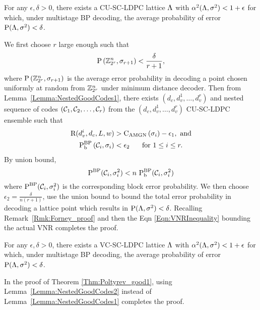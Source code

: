 \documentclass[journal,draftcls,onecolumn,12pt,twoside]{IEEEtran}
\begin{document}
\begin{theorem}\label{Thm:Poltyrev_good1}
   For any $\epsilon,\delta>0$, there exists a CU-SC-LDPC lattice $\Lambda$ with $\alpha^2(\Lambda,\sigma^2)<1+\epsilon$ for which, under multistage BP decoding, the average probability of error $\text{P}(\Lambda,\sigma^{2})<\delta$.
\end{theorem}
\begin{IEEEproof}
We first choose $r$ large enough such that 
\begin{equation}
\text{P}\left(\mathbb{Z}_{2^{r}}^{n},\sigma_{r+1}\right)<\frac{\delta}{r+1},\notag
\end{equation}
where $\text{P}\left(\mathbb{Z}_{2^{r}}^{n},\sigma_{r+1}\right)$ is the average error probability in decoding a point chosen uniformly at random from $\mathbb{Z}_{2^{r}}^{n}$ under minimum distance decoder. 
Then from Lemma~\ref{Lemma:NestedGoodCodes1}, there exists $(d_{c},d_{v}^{1},\ldots,d_{v}^{r})$ and nested sequence of codes $(\mathcal{C}_{1}, \mathcal{C}_{2}, \ldots,\mathcal{C}_{r})$ from the $(d_{c},d_{v}^{1},\ldots,d_{v}^{r})$ CU-SC-LDPC ensemble such that 
\begin{align}
\text{R}(d_{v}^{i},d_{c},L,w)&>\text{C}_{\text{AMGN}}\left(\sigma_{i}\right)-\epsilon_{1}, \text{ and} \\
\text{P}_{\text{b}}^{\text{BP}}\left(\mathcal{C}_{i},\sigma_{i}\right)&<\epsilon_{2} \hspace{0.5cm}\text{ for }1\leq i \leq r.
\end{align}	
By union bound,  %
\begin{equation}\label{Eqn:Ineq-UncodedLevel}
\text{P}^{\text{BP}}(\mathcal{C}_{i},\sigma^{2}_{i})< n~\text{P}_{\text{b}}^{\text{BP}}(\mathcal{C}_{i},\sigma^{2}_{i})
\end{equation}
 where $\text{P}^{\text{BP}}(\mathcal{C}_{i},\sigma^{2}_{i})$ is the corresponding block error probability. We then choose $\epsilon_{2}=\frac{\delta}{n(r+1)}$, use the union bound to bound the total error probability in decoding a lattice point which results in $\text{P}(\Lambda,\sigma^{2})<\delta$. Recalling Remark~\ref{Rmk:Forney_proof} and then the Eqn \eqref{Eqn:VNRInequality} bounding the actual VNR completes the proof.
\end{IEEEproof}

\begin{theorem}\label{Thm:Poltyrev_good2}
   For any $\epsilon,\delta>0$, there exists a VC-SC-LDPC lattice $\Lambda$ with $\alpha^2(\Lambda,\sigma^2)<1+\epsilon$ for which, under multistage BP decoding, the average probability of error $\text{P}(\Lambda,\sigma^{2})<\delta$.
\end{theorem}
\begin{IEEEproof}
In the proof of Theorem \ref{Thm:Poltyrev_good1}, using Lemma~\ref{Lemma:NestedGoodCodes2} instead of Lemma~\ref{Lemma:NestedGoodCodes1} completes the proof. \end{IEEEproof}
\end{document}
